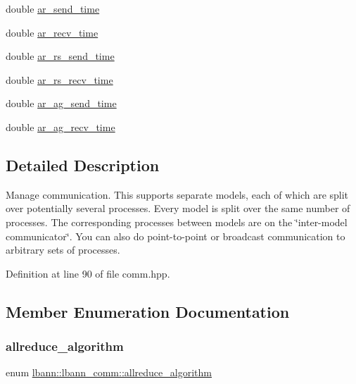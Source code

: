 \begin{DoxyCompactItemize}
\item 
double \hyperlink{classlbann_1_1lbann__comm_a60a664f47efb52d9936b72d34059d1ef}{ar\+\_\+send\+\_\+time}
\item 
double \hyperlink{classlbann_1_1lbann__comm_a4c9323938961c3524dc67f4b7b47e3ae}{ar\+\_\+recv\+\_\+time}
\item 
double \hyperlink{classlbann_1_1lbann__comm_aaadab22d368e8004a9877828a3bc9e93}{ar\+\_\+rs\+\_\+send\+\_\+time}
\item 
double \hyperlink{classlbann_1_1lbann__comm_adefa0ee8b0a6b74072448e20d40f502d}{ar\+\_\+rs\+\_\+recv\+\_\+time}
\item 
double \hyperlink{classlbann_1_1lbann__comm_a64cb0b86e9368c1d83370ba6cb0083ba}{ar\+\_\+ag\+\_\+send\+\_\+time}
\item 
double \hyperlink{classlbann_1_1lbann__comm_a1896c3ecd1d5b084497c6ed47c1c9bae}{ar\+\_\+ag\+\_\+recv\+\_\+time}
\end{DoxyCompactItemize}


\subsection{Detailed Description}
Manage communication. This supports separate models, each of which are split over potentially several processes. Every model is split over the same number of processes. The corresponding processes between models are on the \char`\"{}inter-\/model
communicator\char`\"{}. You can also do point-\/to-\/point or broadcast communication to arbitrary sets of processes. 

Definition at line 90 of file comm.\+hpp.



\subsection{Member Enumeration Documentation}
\mbox{\label{classlbann_1_1lbann__comm_a02a03227cc27e3516f0d9f9812f32019}} 
\subsubsection{\texorpdfstring{allreduce\+\_\+algorithm}{allreduce\_algorithm}}
{\footnotesize\ttfamily enum \hyperlink{classlbann_1_1lbann__comm_a02a03227cc27e3516f0d9f9812f32019}{lbann\+::lbann\+\_\+comm\+::allreduce\+\_\+algorithm}\hspace{0.3cm}{\ttfamily [strong]}}

